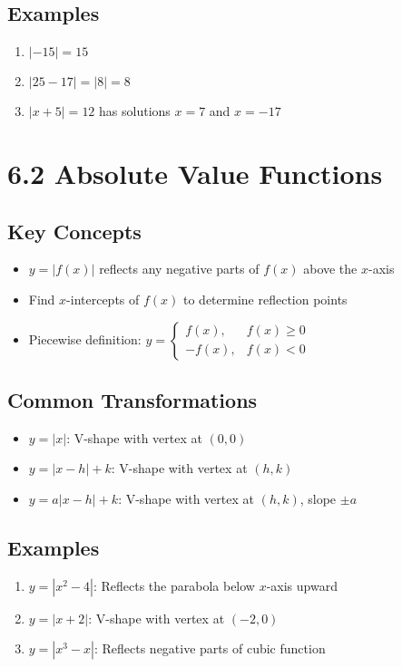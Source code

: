 \documentclass[12pt]{article}
\begin{document}
\subsection*{Examples}
\begin{enumerate}
    \item $|-15| = 15$
    \item $|25 - 17| = |8| = 8$
    \item $|x + 5| = 12$ has solutions $x = 7$ and $x = -17$
\end{enumerate}

\section{6.2 Absolute Value Functions}
\subsection*{Key Concepts}
\begin{tcolorbox}[colback=lightgray,colframe=primary,title=Graphing Absolute Value Functions]
    \begin{itemize}
        \item $y = |f(x)|$ reflects any negative parts of $f(x)$ above the $x$-axis
        \item Find $x$-intercepts of $f(x)$ to determine reflection points
        \item Piecewise definition: $y = \begin{cases} f(x), & f(x) \geq 0 \\ -f(x), & f(x) < 0 \end{cases}$
    \end{itemize}
\end{tcolorbox}

\subsection*{Common Transformations}
\begin{itemize}
    \item $y = |x|$: V-shape with vertex at $(0,0)$
    \item $y = |x - h| + k$: V-shape with vertex at $(h,k)$
    \item $y = a|x - h| + k$: V-shape with vertex at $(h,k)$, slope $\pm a$
\end{itemize}

\subsection*{Examples}
\begin{enumerate}
    \item $y = |x^2 - 4|$: Reflects the parabola below $x$-axis upward
    \item $y = |x + 2|$: V-shape with vertex at $(-2,0)$
    \item $y = |x^3 - x|$: Reflects negative parts of cubic function
\end{enumerate}
\end{document}
